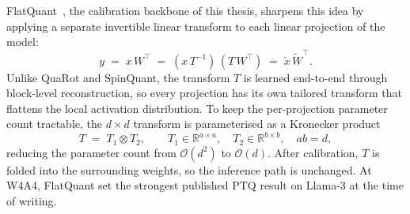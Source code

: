\documentclass[a4paper,11pt,oneside]{article}
\theoremstyle{breakstyle}
\begin{document}
FlatQuant~\cite{FlatQuant2024}, the calibration backbone of this
thesis, sharpens this idea by applying a separate invertible linear
transform to each linear projection of the model:
\begin{equation}
y \;=\; x\,W^{\top}
   \;=\; (x\,T^{-1})\,(T\,W^{\top})
   \;=\; \tilde x\, \tilde W^{\top}.
\label{eq:flatquant_invariance}
\end{equation}
Unlike QuaRot and SpinQuant, the transform $T$ is learned end-to-end
through block-level reconstruction, so every projection has its own
tailored transform that flattens the local activation distribution.
To keep the per-projection parameter count tractable, the
$d \times d$ transform is parameterised as a Kronecker product
\begin{equation}
T \;=\; T_1 \otimes T_2,
\qquad
T_1 \in \mathbb{R}^{a \times a}, \quad
T_2 \in \mathbb{R}^{b \times b}, \quad
ab = d,
\label{eq:flatquant_kron}
\end{equation}
reducing the parameter count from $\mathcal{O}(d^2)$ to
$\mathcal{O}(d)$. After calibration, $T$ is folded into the
surrounding weights, so the inference path is unchanged. At W4A4,
FlatQuant set the strongest published PTQ result on Llama-3 at the
time of writing.
\end{document}
